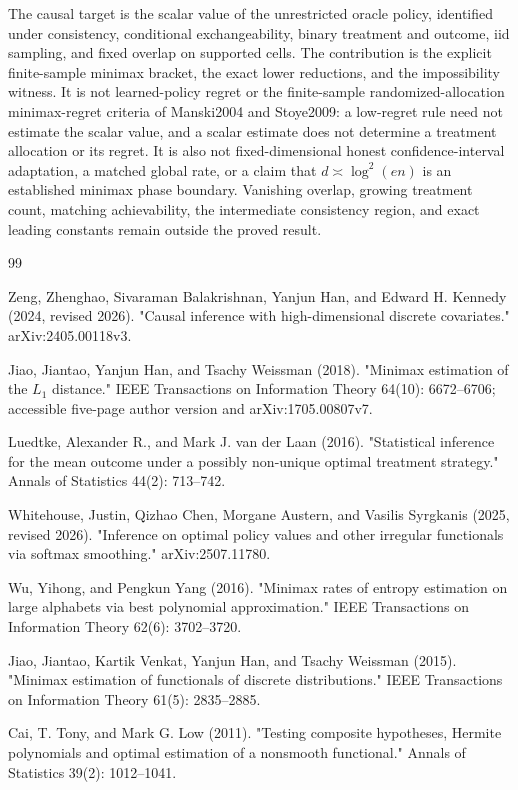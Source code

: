 \documentclass{article}
\begin{document}
The causal target is the scalar value of the unrestricted oracle policy, identified under consistency, conditional exchangeability, binary treatment and outcome, iid sampling, and fixed overlap on supported cells. The contribution is the explicit finite-sample minimax bracket, the exact lower reductions, and the impossibility witness. It is not learned-policy regret or the finite-sample randomized-allocation minimax-regret criteria of Manski2004 and Stoye2009: a low-regret rule need not estimate the scalar value, and a scalar estimate does not determine a treatment allocation or its regret. It is also not fixed-dimensional honest confidence-interval adaptation, a matched global rate, or a claim that \(d\asymp\log^2(en)\) is an established minimax phase boundary. Vanishing overlap, growing treatment count, matching achievability, the intermediate consistency region, and exact leading constants remain outside the proved result.

\begin{thebibliography}{99}

   Zeng, Zhenghao, Sivaraman Balakrishnan, Yanjun Han, and Edward H. Kennedy (2024, revised 2026). "Causal inference with high-dimensional discrete covariates." arXiv:2405.00118v3.

   Jiao, Jiantao, Yanjun Han, and Tsachy Weissman (2018). "Minimax estimation of the \(L_1\) distance." IEEE Transactions on Information Theory 64(10): 6672--6706; accessible five-page author version and arXiv:1705.00807v7.

   Luedtke, Alexander R., and Mark J. van der Laan (2016). "Statistical inference for the mean outcome under a possibly non-unique optimal treatment strategy." Annals of Statistics 44(2): 713--742.

   Whitehouse, Justin, Qizhao Chen, Morgane Austern, and Vasilis Syrgkanis (2025, revised 2026). "Inference on optimal policy values and other irregular functionals via softmax smoothing." arXiv:2507.11780.

   Wu, Yihong, and Pengkun Yang (2016). "Minimax rates of entropy estimation on large alphabets via best polynomial approximation." IEEE Transactions on Information Theory 62(6): 3702--3720.

   Jiao, Jiantao, Kartik Venkat, Yanjun Han, and Tsachy Weissman (2015). "Minimax estimation of functionals of discrete distributions." IEEE Transactions on Information Theory 61(5): 2835--2885.

   Cai, T. Tony, and Mark G. Low (2011). "Testing composite hypotheses, Hermite polynomials and optimal estimation of a nonsmooth functional." Annals of Statistics 39(2): 1012--1041.

\end{thebibliography}
\end{document}

